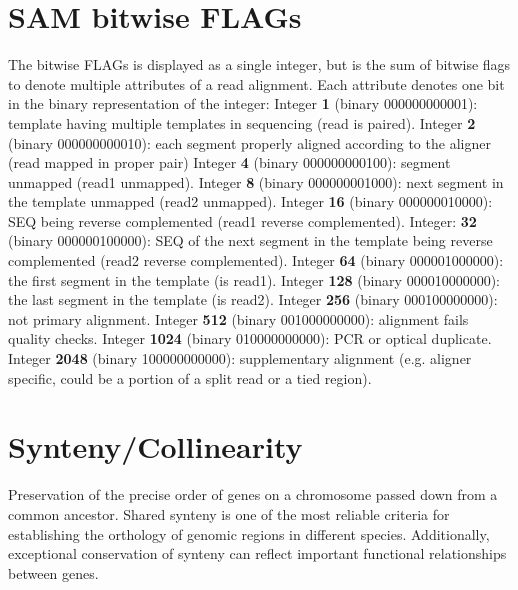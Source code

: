 \documentclass[11pt]{article}
\begin{document}
\begin{sloppypar}
\section{SAM bitwise FLAGs}
The bitwise FLAGs is displayed as a single integer, but is the sum of bitwise flags to denote multiple attributes of a read alignment. 
Each attribute denotes one bit in the binary representation of the integer:
\newline
Integer \textbf{1} (binary 000000000001): 
template having multiple templates in sequencing (read is paired).
\newline
Integer \textbf{2} (binary 000000000010): 
each segment properly aligned according to the aligner (read mapped in proper pair)
\newline
Integer \textbf{4} (binary	000000000100): 
segment unmapped (read1 unmapped).
\newline
Integer \textbf{8} (binary 000000001000): 
next segment in the template unmapped (read2 unmapped).
\newline
Integer \textbf{16} (binary 000000010000): 
SEQ being reverse complemented (read1 reverse complemented).
\newline
Integer: \textbf{32} (binary 000000100000): 
SEQ of the next segment in the template being reverse complemented (read2 reverse complemented).
\newline
Integer \textbf{64} (binary 000001000000): 
the first segment in the template (is read1).
\newline
Integer \textbf{128} (binary 000010000000): 
the last segment in the template (is read2).
\newline
Integer \textbf{256} (binary 000100000000): 
not primary alignment.
\newline
Integer \textbf{512} (binary 001000000000): 
alignment fails quality checks.
\newline
Integer \textbf{1024} (binary 010000000000): 
PCR or optical duplicate.
\newline
Integer \textbf{2048} (binary 100000000000): 
supplementary alignment (e.g. aligner specific, could be a portion of a split read or a tied region). 

\section{Synteny/Collinearity}
Preservation of the precise order of genes on a chromosome passed down from a common ancestor. 
Shared synteny is one of the most reliable criteria for establishing the orthology of genomic regions in different species. 
Additionally, exceptional conservation of synteny can reflect important functional relationships between genes.   

\end{sloppypar}
\end{document}
